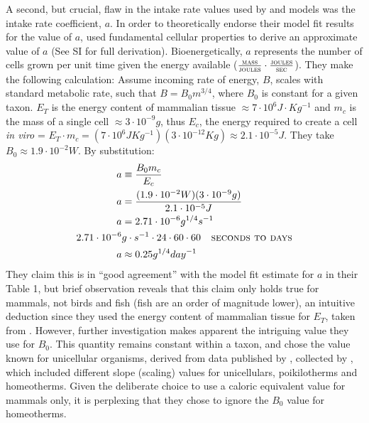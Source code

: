 \documentclass[a4paper]{article} %
\begin{document}
A second, but crucial, flaw in the intake rate values used by \cite{West2001} and \cite{Charnov2001} models was the intake rate coefficient, $a$. In order to theoretically endorse their model fit results for the value of $a$, \cite{West2001} used fundamental cellular properties to derive an approximate value of $a$ (See SI for full derivation). Bioenergetically, $a$ represents the number of cells grown per unit time given the energy available ($\frac{\textsc{mass}}{\textsc{joules}} \cdot \frac{\textsc{joules}}{\textsc{sec}}$). They make the following calculation: Assume incoming rate of energy, $B$, scales with standard metabolic rate, such that $B = B_{0}m^{3/4}$, where $B_0$ is constant for a given taxon. $E_T$ is the energy content of mammalian tissue $\approx 7 \cdot 10^6 J \cdot Kg^{-1}$ and $m_c$ is the mass of a single cell $\approx 3 \cdot 10^{-9} g$, thus $E_c$, the energy required to create a cell \textit{in viro} = $E_T \cdot m_c = (7 \cdot 10^6 JKg^{-1})(3 \cdot 10^{-12} Kg) \approx 2.1 \cdot 10^{-5} J$. They take  $B_0 \approx 1.9 \cdot 10^{-2} W$. By substitution:
\begin{align*}
    a &\equiv \frac{B_{0}m_{c}}{E_{c}} \\
    a &= \frac{(1.9 \cdot 10^{-2} W)(3 \cdot 10^{-9} g)}{2.1 \cdot 10^{-5} J}\\
    a &= 2.71 \cdot 10^{-6} g^{1/4}s^{-1} \\
    2.71 \cdot 10^{-6}&g\cdot s^{-1} \cdot 24 \cdot 60 \cdot 60 \ \ \textsc{   seconds to days}\\
    a &\approx 0.25 g^{1/4}day^{-1}
\end{align*}
They claim this is in ``good agreement'' with the model fit estimate for $a$ in their Table 1, but brief observation reveals that this claim only holds true for mammals, not birds and fish (fish are an order of magnitude lower), an intuitive deduction since they used the energy content of mammalian tissue for $E_T$, taken from \cite{peters1983}. However, further investigation makes apparent the intriguing value they use for $B_0$. This quantity remains constant within a taxon, and \cite{West2001} chose the value known for unicellular organisms, derived from data published by \cite{Hemmingsen1960}, collected by \cite{peters1983}, which included different slope (scaling) values for unicellulars, poikilotherms and homeotherms. Given the deliberate choice to use a caloric equivalent value for mammals only, it is perplexing that they chose to ignore the $B_0$ value for homeotherms.
\end{document}

